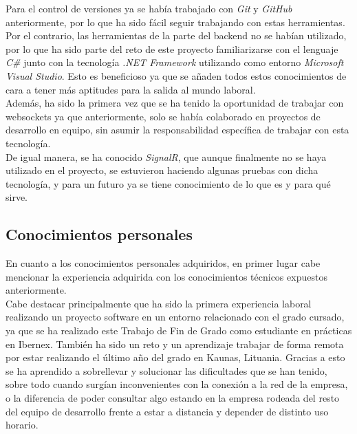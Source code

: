 Para el control de versiones ya se había trabajado con \textit{Git} y \textit{GitHub} anteriormente, por lo que ha sido fácil seguir trabajando con estas herramientas.\\

Por el contrario, las herramientas de la parte del backend no se habían utilizado, por lo que ha sido parte del reto de este proyecto familiarizarse con el lenguaje \textit{C\#} junto con la tecnología \textit{.NET Framework} utilizando como entorno \textit{Microsoft Visual Studio}. Esto es beneficioso ya que se añaden todos estos conocimientos de cara a tener más aptitudes para la salida al mundo laboral.\\

Además, ha sido la primera vez que se ha tenido la oportunidad de trabajar con websockets ya que anteriormente, solo se había colaborado en proyectos de desarrollo en equipo, sin asumir la responsabilidad específica de trabajar con esta tecnología. \\

De igual manera, se ha conocido \textit{SignalR}, que aunque finalmente no se haya utilizado en el proyecto, se estuvieron haciendo algunas pruebas con dicha tecnología, y para un futuro ya se tiene conocimiento de lo que es y para qué sirve.

\subsection{Conocimientos personales}

En cuanto a los conocimientos personales adquiridos, en primer lugar cabe mencionar la experiencia adquirida con los conocimientos técnicos expuestos anteriormente.\\

Cabe destacar principalmente que ha sido la primera experiencia laboral realizando un proyecto software en un entorno relacionado con el grado cursado, ya que se ha realizado este Trabajo de Fin de Grado como estudiante en prácticas en Ibernex. También ha sido un reto y un aprendizaje trabajar de forma remota por estar realizando el último año del grado en Kaunas, Lituania. Gracias a esto se ha aprendido a sobrellevar y solucionar las dificultades que se han tenido, sobre todo cuando surgían inconvenientes con la conexión a la red de la empresa, o la diferencia de poder consultar algo estando en la empresa rodeada del resto del equipo de desarrollo frente a estar a distancia y depender de distinto uso horario.\\

